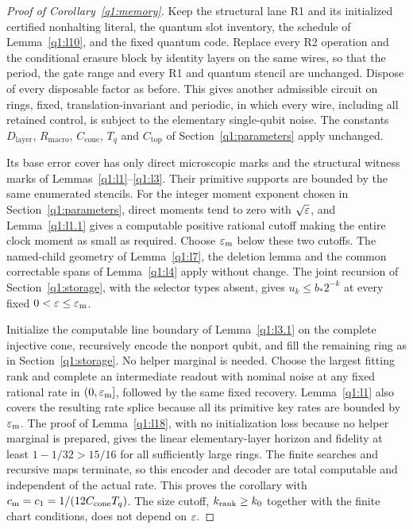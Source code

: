 \begin{proof}[Proof of Corollary~\ref{q1:memory}]
Keep the structural lane R1 and its initialized certified nonhalting literal, the quantum slot inventory, the schedule of Lemma~\ref{q1:l10}, and the fixed quantum code. Replace every R2 operation and the conditional erasure block by identity layers on the same wires, so that the period, the gate range and every R1 and quantum stencil are unchanged. Dispose of every disposable factor as before. This gives another admissible circuit on rings, fixed, translation-invariant and periodic, in which every wire, including all retained control, is subject to the elementary single-qubit noise. The constants \(D_{\mathrm{layer}}\), \(R_{\mathrm{macro}}\), \(C_{\mathrm{cone}}\), \(T_q\) and \(C_{\mathrm{top}}\) of Section~\ref{q1:parameters} apply unchanged.

Its base error cover has only direct microscopic marks and the structural witness marks of Lemmas~\ref{q1:l1}--\ref{q1:l3}. Their primitive supports are bounded by the same enumerated stencils. For the integer moment exponent chosen in Section~\ref{q1:parameters}, direct moments tend to zero with \(\sqrt{\varepsilon}\), and Lemma~\ref{q1:l1.1} gives a computable positive rational cutoff making the entire clock moment as small as required. Choose \(\varepsilon_{\rm m}\) below these two cutoffs. The named-child geometry of Lemma~\ref{q1:l7}, the deletion lemma and the common correctable spans of Lemma~\ref{q1:l4} apply without change. The joint recursion of Section~\ref{q1:storage}, with the selector types absent, gives \(u_k\le b_*2^{-k}\) at every fixed \(0<\varepsilon\le\varepsilon_{\rm m}\).

Initialize the computable line boundary of Lemma~\ref{q1:l3.1} on the complete injective cone, recursively encode the nonport qubit, and fill the remaining ring as in Section~\ref{q1:storage}. No helper marginal is needed. Choose the largest fitting rank and complete an intermediate readout with nominal noise at any fixed rational rate in \((0,\varepsilon_{\rm m}]\), followed by the same fixed recovery. Lemma~\ref{q1:l1} also covers the resulting rate splice because all its primitive key rates are bounded by \(\varepsilon_{\rm m}\). The proof of Lemma~\ref{q1:l18}, with no initialization loss because no helper marginal is prepared, gives the linear elementary-layer horizon and fidelity at least \(1-1/32>15/16\) for all sufficiently large rings. The finite searches and recursive maps terminate, so this encoder and decoder are total computable and independent of the actual rate. This proves the corollary with \(c_{\rm m}=c_1=1/(12C_{\rm cone}T_q)\). The size cutoff, \(k_{\rm rank}\ge k_0\) together with the finite chart conditions, does not depend on \(\varepsilon\).
\end{proof}
